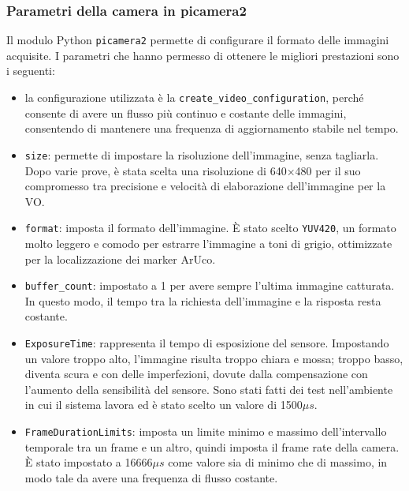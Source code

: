 \subsubsection{Parametri della camera in picamera2}
Il modulo Python \texttt{picamera2} permette di configurare il formato delle immagini acquisite. I parametri che hanno permesso di ottenere le migliori prestazioni sono i seguenti:
\begin{itemize}
	\item la configurazione utilizzata è la \texttt{create\_video\_configuration}, perché consente di avere un flusso più continuo e costante delle immagini, consentendo di mantenere una frequenza di aggiornamento stabile nel tempo.
	\item \texttt{size}: permette di impostare la risoluzione dell'immagine, senza tagliarla. Dopo varie prove, è stata scelta una risoluzione di 640×480 per il suo compromesso tra precisione e velocità di elaborazione dell'immagine per la VO.
	\item \texttt{format}: imposta il formato dell'immagine. È stato scelto \texttt{YUV420}, un formato molto leggero e comodo per estrarre l'immagine a toni di grigio, ottimizzate per la localizzazione dei marker ArUco.
	\item \texttt{buffer\_count}: impostato a 1 per avere sempre l'ultima immagine catturata. In questo modo, il tempo tra la richiesta dell'immagine e la risposta resta costante.
	\item \texttt{ExposureTime}: rappresenta il tempo di esposizione del sensore. Impostando un valore troppo alto, l'immagine risulta troppo chiara e mossa; troppo basso, diventa scura e con delle imperfezioni, dovute dalla compensazione con l'aumento della sensibilità del sensore. Sono stati fatti dei test nell'ambiente in cui il sistema lavora ed è stato scelto un valore di 1500\(\mu s\).
	\item \texttt{FrameDurationLimits}: imposta un limite minimo e massimo dell'intervallo temporale tra un frame e un altro, quindi imposta il frame rate della camera. È stato impostato a 16666\(\mu s\) come valore sia di minimo che di massimo, in modo tale da avere una frequenza di flusso costante.
\end{itemize}

